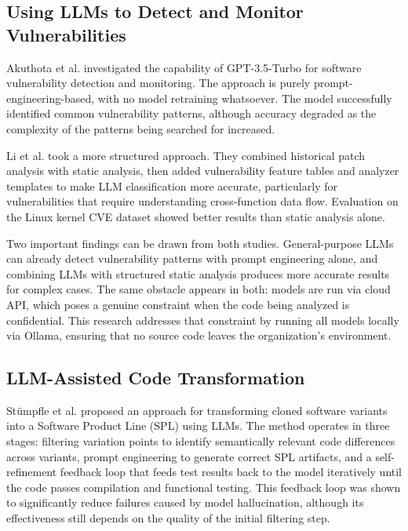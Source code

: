 \subsection{Using LLMs to Detect and Monitor Vulnerabilities}

Akuthota et al. \cite{akuthota2023vulnerability} investigated the capability of GPT-3.5-Turbo for software vulnerability detection and monitoring. The approach is purely prompt-engineering-based, with no model retraining whatsoever. The model successfully identified common vulnerability patterns, although accuracy degraded as the complexity of the patterns being searched for increased.

Li et al. \cite{li2025software} took a more structured approach. They combined historical patch analysis with static analysis, then added vulnerability feature tables and analyzer templates to make LLM classification more accurate, particularly for vulnerabilities that require understanding cross-function data flow. Evaluation on the Linux kernel CVE dataset showed better results than static analysis alone.

Two important findings can be drawn from both studies. General-purpose LLMs can already detect vulnerability patterns with prompt engineering alone, and combining LLMs with structured static analysis produces more accurate results for complex cases. The same obstacle appears in both: models are run via cloud API, which poses a genuine constraint when the code being analyzed is confidential. This research addresses that constraint by running all models locally via Ollama, ensuring that no source code leaves the organization's environment.

\subsection{LLM-Assisted Code Transformation}

Stümpfle et al. \cite{stumpfle2025llm} proposed an approach for transforming cloned software variants into a Software Product Line (SPL) using LLMs. The method operates in three stages: filtering variation points to identify semantically relevant code differences across variants, prompt engineering to generate correct SPL artifacts, and a self-refinement feedback loop that feeds test results back to the model iteratively until the code passes compilation and functional testing. This feedback loop was shown to significantly reduce failures caused by model hallucination, although its effectiveness still depends on the quality of the initial filtering step.

